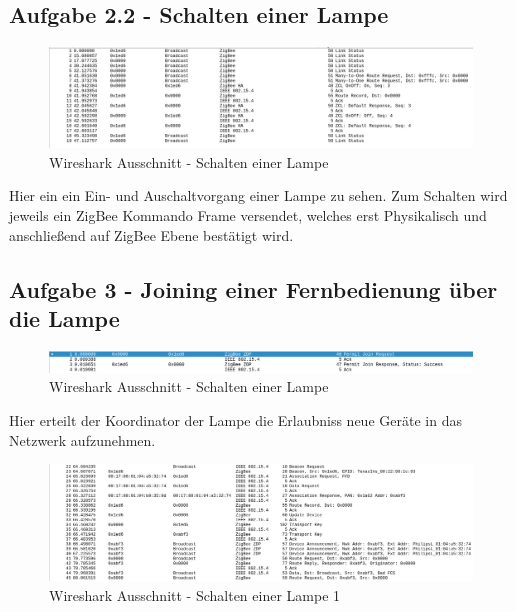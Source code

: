 \subsection{Aufgabe 2.2 - Schalten einer Lampe}

\begin{figure}[H]
    \centering
    \includegraphics[width=1\textwidth]{media/lsg2.2.png}
    \caption{Wireshark Ausschnitt - Schalten einer Lampe}
\end{figure}

Hier ein ein Ein- und Auschaltvorgang einer Lampe zu sehen. Zum Schalten wird jeweils ein \grqq ZigBee Kommando Frame\grqq{} versendet, welches erst Physikalisch und 
anschließend auf ZigBee Ebene bestätigt wird.

\subsection{Aufgabe 3 - Joining einer Fernbedienung über die Lampe}

\begin{figure}[H]
    \centering
    \includegraphics[width=1\textwidth]{media/lsg-3-1.png}
    \caption{Wireshark Ausschnitt - Schalten einer Lampe}
\end{figure}

Hier erteilt der Koordinator der Lampe die Erlaubniss neue Geräte in das Netzwerk aufzunehmen.

\begin{figure}[H]
    \centering
    \includegraphics[width=1\textwidth]{media/lsg-3-2.png}
    \caption{Wireshark Ausschnitt - Schalten einer Lampe 1}
\end{figure}


